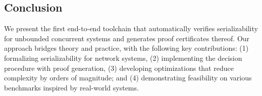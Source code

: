 %

%
%
%


\subsection{Conclusion}
We present the first end-to-end toolchain that automatically verifies serializability for unbounded concurrent systems and generates proof certificates thereof.
Our approach bridges theory and practice, with the following key contributions:
%
(1) formalizing serializability for network systems, (2) implementing the decision procedure with proof generation, (3) developing optimizations that reduce complexity by orders of magnitude; and (4) demonstrating feasibility on various benchmarks inspired by real-world systems.
%

